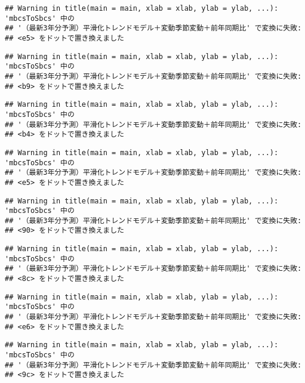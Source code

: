\documentclass[]{article}
\begin{document}
\begin{verbatim}
## Warning in title(main = main, xlab = xlab, ylab = ylab, ...): 'mbcsToSbcs' 中の
## '（最新3年分予測）平滑化トレンドモデル＋変動季節変動＋前年同期比' で変換に失敗:
## <e5> をドットで置き換えました
\end{verbatim}

\begin{verbatim}
## Warning in title(main = main, xlab = xlab, ylab = ylab, ...): 'mbcsToSbcs' 中の
## '（最新3年分予測）平滑化トレンドモデル＋変動季節変動＋前年同期比' で変換に失敗:
## <b9> をドットで置き換えました
\end{verbatim}

\begin{verbatim}
## Warning in title(main = main, xlab = xlab, ylab = ylab, ...): 'mbcsToSbcs' 中の
## '（最新3年分予測）平滑化トレンドモデル＋変動季節変動＋前年同期比' で変換に失敗:
## <b4> をドットで置き換えました
\end{verbatim}

\begin{verbatim}
## Warning in title(main = main, xlab = xlab, ylab = ylab, ...): 'mbcsToSbcs' 中の
## '（最新3年分予測）平滑化トレンドモデル＋変動季節変動＋前年同期比' で変換に失敗:
## <e5> をドットで置き換えました
\end{verbatim}

\begin{verbatim}
## Warning in title(main = main, xlab = xlab, ylab = ylab, ...): 'mbcsToSbcs' 中の
## '（最新3年分予測）平滑化トレンドモデル＋変動季節変動＋前年同期比' で変換に失敗:
## <90> をドットで置き換えました
\end{verbatim}

\begin{verbatim}
## Warning in title(main = main, xlab = xlab, ylab = ylab, ...): 'mbcsToSbcs' 中の
## '（最新3年分予測）平滑化トレンドモデル＋変動季節変動＋前年同期比' で変換に失敗:
## <8c> をドットで置き換えました
\end{verbatim}

\begin{verbatim}
## Warning in title(main = main, xlab = xlab, ylab = ylab, ...): 'mbcsToSbcs' 中の
## '（最新3年分予測）平滑化トレンドモデル＋変動季節変動＋前年同期比' で変換に失敗:
## <e6> をドットで置き換えました
\end{verbatim}

\begin{verbatim}
## Warning in title(main = main, xlab = xlab, ylab = ylab, ...): 'mbcsToSbcs' 中の
## '（最新3年分予測）平滑化トレンドモデル＋変動季節変動＋前年同期比' で変換に失敗:
## <9c> をドットで置き換えました
\end{verbatim}
\end{document}
